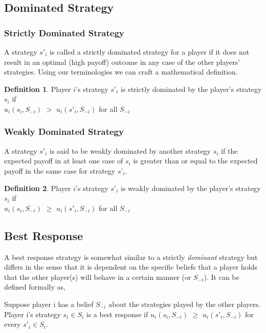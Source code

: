 \documentclass[11pt]{article}
\theoremstyle{definition}
\newtheorem*{definition}{Definition}
\begin{document}
\subsection{Dominated Strategy}

\subsubsection*{Strictly Dominated Strategy}
A strategy $s'_i$ is called a strictly dominated strategy for a player if it does not result in an optimal (high payoff) outcome in any case of the other players’ strategies. Using our terminologies we can craft a mathematical definition.

\begin{definition}
Player $i$'s strategy $s'_i$ is strictly dominated by the player's strategy $s_i$ if\\ $u_{i}(s_i, S_{-i})$ $>$ $u_{i}(s'_i, S_{-i})$ for all $S_{-i}$
\end{definition}

\subsubsection*{Weakly Dominated Strategy}
A strategy $s'_i$ is said to be weakly dominated by another strategy $s_i$ if the expected payoff in at least one case of $s_i$ is greater than or equal to the expected payoff in the same case for strategy $s’_i$.

\begin{definition}
Player $i$'s strategy $s'_i$ is weakly dominated by the player's strategy $s_i$ if\\ $u_{i}(s_i, S_{-i})$ $\geq$ $u_{i}(s'_i, S_{-i})$ for all $S_{-i}$
\end{definition}

\subsection{Best Response}
A best response strategy is somewhat similar to a strictly \textit{dominant} strategy but differs in the sense that it is dependent on the specific beliefs that a player holds that the other player(s) will behave in a certain manner (or $S_{-i}$). It can be defined formally as,

Suppose player i has a belief $S_{-i}$ about the strategies played by the other players. Player i's strategy $s_i \in S_i$ is a best response if $u_{i}(s_i, S_{-i})$ $\geq$ $u_{i}(s'_i, S_{-i})$ for every $s'_i \in S_i$.
\end{document}
